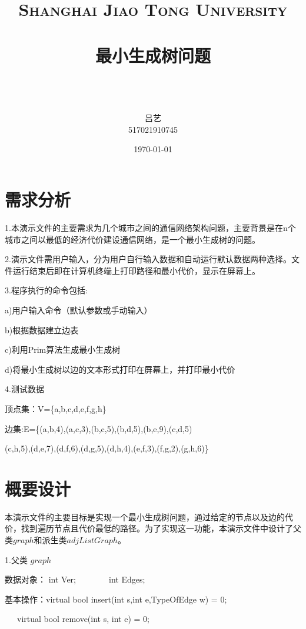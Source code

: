 \documentclass[paper=a4,UTF8,fontsize=11pt]{scrartcl} %
\title{
\normalfont \normalsize
\textsc{Shanghai Jiao Tong University} \\ [25pt] %
\horrule{0.5pt} \\[0.4cm] %
\huge 最小生成树问题 \\ %
\horrule{2pt} \\[0.5cm] %
}
\author{\\ \kaishu 吕艺\\ \normalsize 517021910745} %
\date{\normalsize\today} %
\numberwithin{equation}{section} %
\numberwithin{figure}{section} %
\numberwithin{table}{section} %
\begin{document}
\maketitle %
\kaishu
\section{需求分析}

1.本演示文件的主要需求为几个城市之间的通信网络架构问题，主要背景是在n个城市之间以最低的经济代价建设通信网络，是一个最小生成树的问题。
\vspace{0.5cm}

2.演示文件需用户输入，分为用户自行输入数据和自动运行默认数据两种选择。文件运行结束后即在计算机终端上打印路径和最小代价，显示在屏幕上。
\vspace{0.5cm}

3.程序执行的命令包括:

a)用户输入命令（默认参数或手动输入）

b)根据数据建立边表

c)利用Prim算法生成最小生成树

d)将最小生成树以边的文本形式打印在屏幕上，并打印最小代价

\vspace{0.8cm}

\newpage

4.测试数据

顶点集：V=\{a,b,c,d,e,f,g,h\}

边集:E=\{(a,b,4),(a,c,3),(b,c,5),(b,d,5),(b,e,9),(c,d,5)

\qquad \qquad (c,h,5),(d,e,7),(d,f,6),(d,g,5),(d,h,4),(e,f,3),(f,g,2),(g,h,6)\}

\vspace{0.8cm}

\section{概要设计}

本演示文件的主要目标是实现一个最小生成树问题，通过给定的节点以及边的代价，找到遍历节点且代价最低的路径。为了实现这一功能，本演示文件中设计了父类$graph$和派生类$adjListGraph$。

1.父类 $graph$

数据对象： int Ver;\ \ \ \ \ \ \ \ int Edges;

基本操作：virtual bool insert(int s,int e,TypeOfEdge w) = 0;

\qquad \qquad \quad \ \ \ virtual bool remove(int s, int e) = 0;
\end{document}
